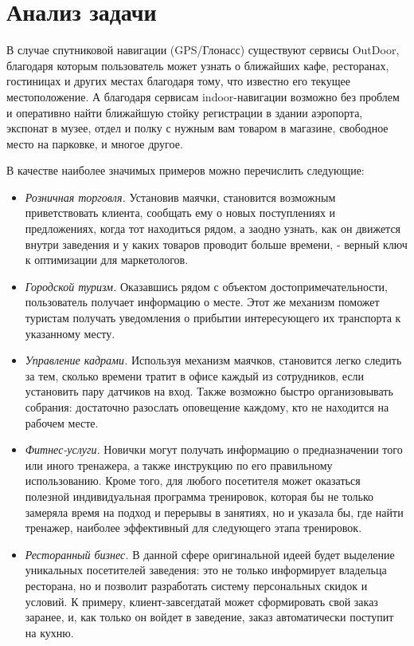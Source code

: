 \section{Анализ задачи}

В случае спутниковой навигации (GPS/Глонасс) существуют сервисы Out\-Door, благодаря которым пользователь может узнать о ближайших кафе, ресторанах, гостиницах и других местах благодаря тому, что известно его текущее местоположение. А благодаря сервисам indoor-навигации возможно без проблем и оперативно найти ближайшую стойку регистрации в здании аэропорта, экспонат в музее, отдел и полку с нужным вам товаром в магазине, свободное место на парковке, и многое другое. 

В качестве наиболее значимых примеров можно перечислить следующие:
\begin{itemize}
    \item
    \textit{Розничная торговля.} Установив маячки, становится возможным приветствовать клиента, сообщать ему о новых поступлениях и предложениях, когда тот находиться рядом, а заодно узнать, как он движется внутри заведения и у каких товаров проводит больше времени, - верный ключ к оптимизации для маркетологов.
    \item
    \textit{Городской туризм.} Оказавшись рядом с объектом достопримечательности, пользователь получает информацию о месте. Этот же механизм поможет туристам получать уведомления о прибытии интересующего их транспорта к указанному месту.
    \item
    \textit{Управление кадрами.} Используя механизм маячков, становится легко следить за тем, сколько времени тратит в офисе каждый из сотрудников, если установить пару датчиков на вход. Также возможно быстро организовывать собрания: достаточно разослать оповещение каждому, кто не находится на рабочем месте.
    \item
    \textit{Фитнес-услуги.} Новички могут получать информацию о предназначении того или иного тренажера, а также инструкцию по его правильному использованию. Кроме того, для любого посетителя может оказаться полезной индивидуальная программа тренировок, которая бы не только замеряла время на подход и перерывы в занятиях, но и указала бы, где найти тренажер, наиболее эффективный для следующего этапа тренировок.
    \item
    \textit{Ресторанный бизнес.} В данной сфере оригинальной идеей будет выделение уникальных посетителей заведения: это не только информирует владельца ресторана, но и позволит разработать систему персональных скидок и условий. К примеру, клиент-завсегдатай может сформировать свой заказ заранее, и, как только он войдет в заведение, заказ автоматически поступит на кухню.

\end{itemize}
